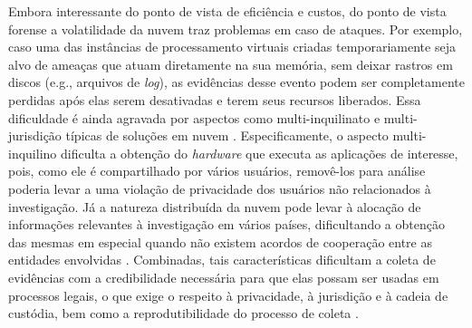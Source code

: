\documentclass[conference]{IEEEtran}
\begin{document}
%
Embora interessante do ponto de vista de eficiência e custos, do ponto de vista forense a volatilidade da nuvem traz problemas em caso de ataques.
%
Por exemplo, caso uma das instâncias de processamento virtuais criadas temporariamente seja alvo de ameaças que atuam diretamente na sua memória, sem deixar rastros em discos (e.g., arquivos de \textit{log}), as evidências desse evento podem ser completamente perdidas após elas serem desativadas e terem seus recursos liberados.
%
Essa dificuldade é ainda agravada por aspectos como multi-inquilinato e multi-jurisdição típicas de soluções em nuvem \cite{Bash_Adv_in_Forensics:2015}.
%
Especificamente, o aspecto multi-inquilino dificulta a obtenção do \textit{hardware} que executa as aplicações de interesse, pois, como ele é compartilhado por vários usuários, removê-los para análise poderia levar a uma violação de privacidade dos usuários não relacionados à investigação. 
%
Já a natureza distribuída da nuvem pode levar à alocação de informações relevantes à investigação em vários países, dificultando a obtenção das mesmas em especial quando não existem acordos de cooperação entre as entidades envolvidas \cite{Dykstra_Acquiring_for_IAAS:2012}.
%
Combinadas, tais características dificultam a coleta de evidências com a credibilidade necessária para que elas possam ser usadas em processos legais,  o que exige o respeito à privacidade, à jurisdição e à cadeia de custódia, bem como a reprodutibilidade do processo de coleta \cite{Rahman_Live_Forensics_Techniques:2015}.
\end{document}
